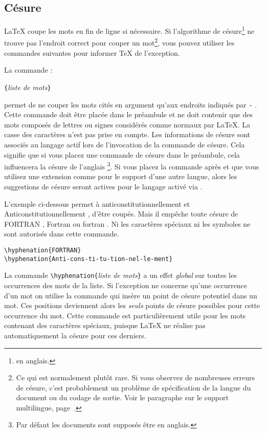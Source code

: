 \subsection{Césure} \label{hyph}
\LaTeX{} coupe les mots en fin de ligne si nécessaire. Si l'algorithme de
césure\footnote{ en anglais.} ne trouve pas
l'endroit correct pour couper un mot\footnote{Ce qui est normalement
plutôt rare. Si vous observez de nombreuses erreurs de césure, c'est
probablement un problème de spécification de la langue du document ou
du codage de sortie. Voir le paragraphe sur le support multilingue,
page~\pageref{international}.}, vous pouvez utiliser les
commandes suivantes pour informer \TeX{} de l'exception.

La commande :
\begin{lscommand}
\verb|{|\emph{liste de mots}\verb|}|
\end{lscommand}
\noindent permet de ne couper les mots cités en argument qu'aux
endroits indiqués par \og \verb|-| \fg{}. Cette commande doit être
placée dans le préambule et ne doit contenir que des mots composés de
lettres ou signes considérés comme normaux par \LaTeX{}. La casse des
caractères n'est pas prise en compte. Les informations de césure sont
associés au langage actif lors de l'invocation de la commande de
césure. Cela signifie que si vous placez une commande de césure dans
le préambule, cela influencera la césure de l'anglais \footnote{Par défaut
les documents sont supposés être en anglais. \NdT}. Si vous placez la
commande après \verb|| et que vous utilisez une
extension comme  pour le support d'une autre langue,
alors les suggestions de césure seront actives pour le langage
activé via .

L'exemple ci-dessous permet à
\og anticonstitutionnellement \fg{} et \og Anticonstitutionnellement
\fg{},  d'être coupés. Mais il empêche toute césure de \og
FORTRAN \fg{}, \og Fortran \fg{} ou \og fortran \fg{}. Ni les
caractères spéciaux ni les symboles ne sont autorisés dans cette
commande.

\begin{code}
\verb|\hyphenation{FORTRAN}|\\
\verb|\hyphenation{Anti-cons-ti-tu-tion-nel-le-ment}|
\end{code}

La commande \verb|\hyphenation{|\emph{liste de mots}\verb|}| a un effet
\emph{global} sur toutes les occurrences des mots de la liste.
Si l'exception ne concerne qu'une occurrence d'un mot on utilise
la commande \ci{-} qui insère un point de  césure potentiel dans un
mot. Ces positions deviennent alors les \emph{seuls} points de césure
possibles pour cette occurrence du mot. Cette commande est
particulièrement utile pour les mots contenant des caractères
spéciaux, puisque \LaTeX{} ne réalise pas automatiquement la césure
pour ces derniers.

